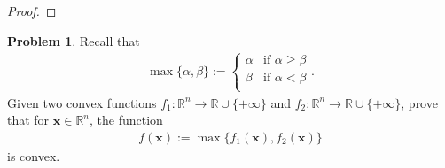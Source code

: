 \documentclass[12pt]{article}
\theoremstyle{definition}
\newtheorem{problem}{Problem}
\newcommand{\vc}[1]{\boldsymbol{#1}}
\begin{document}
\begin{proof}
\end{proof}
\newpage


\begin{problem}
  Recall that
  \begin{align*}
    \max\{\alpha, \beta\} :=
    \begin{cases}
      \alpha & \text{if $\alpha \geq \beta$} \\
      \beta & \text{if $\alpha < \beta$} \\
    \end{cases}.
  \end{align*}
  Given two convex functions $f_1: \mathbb{R}^n \to \mathbb{R} \cup \{+\infty\}$
  and $f_2: \mathbb{R}^n \to \mathbb{R} \cup \{+\infty\}$, prove that for
  $\vc{x} \in \mathbb{R}^n$, the function
  \begin{align*}
    f(\vc{x}) := \max\{f_1(\vc{x}), f_2(\vc{x})\}
  \end{align*}
  is convex.
\end{problem}
\end{document}
